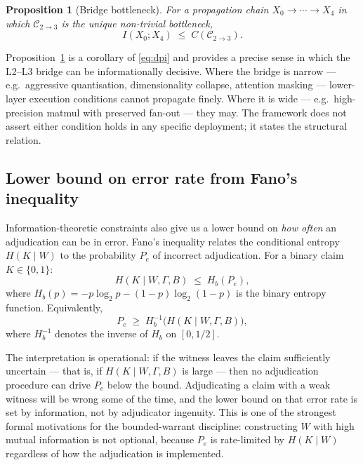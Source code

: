 \documentclass[11pt, a4paper]{article}
\theoremstyle{upldef}
\newtheorem{proposition}{Proposition}
\begin{document}
\begin{proposition}[Bridge bottleneck]\label{prop:bottleneck}
For a propagation chain $X_0 \to \cdots \to X_4$ in which
$\mathcal{C}_{2\to 3}$ is the unique non-trivial bottleneck,
\[
I(X_0; X_4) \;\leq\; C(\mathcal{C}_{2\to 3}).
\]
\end{proposition}

\noindent
Proposition~\ref{prop:bottleneck} is a corollary of \eqref{eq:dpi}
and provides a precise sense in which the L2--L3 bridge can be
informationally decisive. Where the bridge is narrow --- e.g.\
aggressive quantisation, dimensionality collapse, attention masking
--- lower-layer execution conditions cannot propagate finely. Where
it is wide --- e.g.\ high-precision matmul with preserved fan-out ---
they may. The framework does not assert either condition holds in
any specific deployment; it states the structural relation.

\subsection{Lower bound on error rate from Fano's inequality}

Information-theoretic constraints also give us a lower bound on
\emph{how often} an adjudication can be in error. Fano's inequality
\citep{fano1961, cover2006} relates the conditional entropy
$H(K \mid W)$ to the probability $P_e$ of incorrect adjudication.
For a binary claim $K \in \{0, 1\}$:
\begin{equation}
H(K \mid W, \Gamma, B) \;\leq\; H_b(P_e),
\label{eq:fano}
\end{equation}
where $H_b(p) = -p\log_2 p - (1-p)\log_2(1-p)$ is the binary
entropy function. Equivalently,
\begin{equation}
P_e \;\geq\; H_b^{-1}\bigl(H(K \mid W, \Gamma, B)\bigr),
\label{eq:fano-rearranged}
\end{equation}
where $H_b^{-1}$ denotes the inverse of $H_b$ on $[0, 1/2]$.

The interpretation is operational: if the witness leaves the claim
sufficiently uncertain --- that is, if $H(K \mid W, \Gamma, B)$ is
large --- then no adjudication procedure can drive $P_e$ below the
bound. Adjudicating a claim with a weak witness will be wrong some
of the time, and the lower bound on that error rate is set by
information, not by adjudicator ingenuity. This is one of the
strongest formal motivations for the bounded-warrant discipline:
constructing $W$ with high mutual information is not optional,
because $P_e$ is rate-limited by $H(K \mid W)$ regardless of how the
adjudication is implemented.
\end{document}
